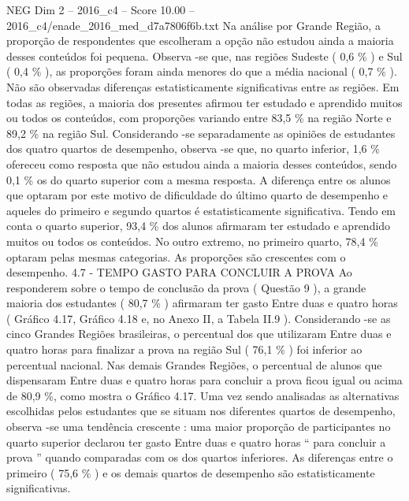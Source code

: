 \begin{textsample}{NEG Dim 2 – 2016\_c4 – Score 10.00 – 2016\_c4/enade\_2016\_med\_d7a7806f6b.txt}
Na análise por Grande Região, a proporção de respondentes que escolheram a opção não estudou ainda a maioria desses conteúdos foi pequena.
Observa -se que, nas regiões Sudeste ( 0,6 \% ) e Sul ( 0,4 \% ), as proporções foram ainda menores do que a média nacional ( 0,7 \% ).
Não são observadas diferenças estatisticamente significativas entre as regiões.
Em todas as regiões, a maioria dos presentes afirmou ter estudado e aprendido muitos ou todos os conteúdos, com proporções variando entre 83,5 \% na região Norte e 89,2 \% na região Sul.
Considerando -se separadamente as opiniões de estudantes dos quatro quartos de desempenho, observa -se que, no quarto inferior, 1,6 \% ofereceu como resposta que não estudou ainda a maioria desses conteúdos, sendo 0,1 \% os do quarto superior com a mesma resposta.
A diferença entre os alunos que optaram por este motivo de dificuldade do último quarto de desempenho e aqueles do primeiro e segundo quartos é estatisticamente significativa.
Tendo em conta o quarto superior, 93,4 \% dos alunos afirmaram ter estudado e aprendido muitos ou todos os conteúdos.
No outro extremo, no primeiro quarto, 78,4 \% optaram pelas mesmas categorias.
As proporções são crescentes com o desempenho. 4.7 - TEMPO GASTO PARA CONCLUIR A PROVA Ao responderem sobre o tempo de conclusão da prova ( Questão 9 ), a grande maioria dos estudantes ( 80,7 \% ) afirmaram ter gasto Entre duas e quatro horas ( Gráfico 4.17, Gráfico 4.18 e, no Anexo II, a Tabela II.9 ).
Considerando -se as cinco Grandes Regiões brasileiras, o percentual dos que utilizaram Entre duas e quatro horas para finalizar a prova na região Sul ( 76,1 \% ) foi inferior ao percentual nacional.
Nas demais Grandes Regiões, o percentual de alunos que dispensaram Entre duas e quatro horas para concluir a prova ficou igual ou acima de 80,9 \%, como mostra o Gráfico 4.17.
Uma vez sendo analisadas as alternativas escolhidas pelos estudantes que se situam nos diferentes quartos de desempenho, observa -se uma tendência crescente : uma maior proporção de participantes no quarto superior declarou ter gasto Entre duas e quatro horas “ para concluir a prova ” quando comparadas com os dos quartos inferiores.
As diferenças entre o primeiro ( 75,6 \% ) e os demais quartos de desempenho são estatisticamente significativas.

\end{textsample}
